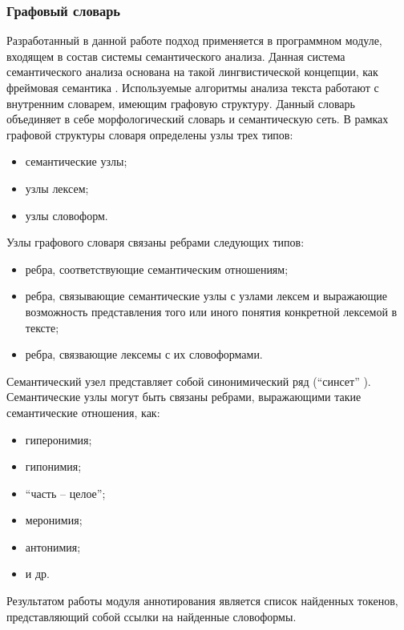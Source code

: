 \subsubsection{Графовый словарь}
Разработанный в данной работе подход применяется в программном модуле, входящем в состав системы семантического анализа. Данная система семантического анализа основана на такой лингвистической концепции, как фреймовая семантика \cite{fillmore1976frame}. Используемые алгоритмы анализа текста работают с внутренним словарем, имеющим графовую структуру. Данный словарь объединяет в себе морфологический словарь и семантическую сеть. В рамках графовой структуры словаря определены узлы трех типов:
\begin{itemize}
	\item
	семантические узлы;
	\item
	узлы лексем;
	\item
	узлы словоформ.
\end{itemize}
Узлы графового словаря связаны ребрами следующих типов:
\begin{itemize}
	\item
	ребра, соответствующие семантическим отношениям;
	\item
	ребра, связывающие семантические узлы с узлами лексем и выражающие возможность представления того или иного понятия конкретной лексемой в тексте;
	\item
	ребра, связвающие лексемы с их словоформами.
\end{itemize}
Семантический узел представляет собой синонимический ряд (``синсет'' \cite{wordnet}). Семантические узлы могут быть связаны ребрами, выражающими такие семантические отношения, как:
\begin{itemize}
\item
гиперонимия;
\item
гипонимия;
\item
``часть -- целое'';
\item
меронимия;
\item
антонимия;
\item
и др.
\end{itemize}
Результатом работы модуля аннотирования является список найденных токенов, представляющий собой ссылки на найденные словоформы.
